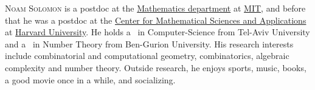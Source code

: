 \documentclass{toc}
\begin{document}
\begin{tocaboutauthors}
\begin{tocabout}[solomon]
  \textsc{Noam Solomon} is a postdoc  
at the \href{https://math.mit.edu}{Mathematics department} at
\href{http://www.mit.edu}{MIT}, and before that he was a postdoc 
at the \href{http://cmsa.fas.harvard.edu}{Center for Mathematical Sciences
and Applications} at \href{https://www.harvard.edu}{Harvard University}. 
He holds a \phd\ in Computer-Science from Tel-Aviv University and a \phd\
in Number Theory from Ben-Gurion University. 
His research interests include combinatorial and computational geometry,
combinatorics, algebraic complexity and number theory. 
Outside research, he enjoys sports, music, books, a good movie once in
a while, and socializing.
\end{tocabout}
\end{tocaboutauthors}
\end{document}
